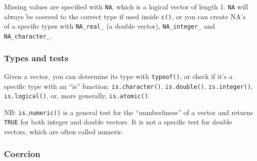 Missing values are specified with \texttt{NA}, which is a logical vector
of length 1. \texttt{NA} will always be coerced to the correct type if
used inside \texttt{c()}, or you can create NA's of a specific types
with \texttt{NA\_real\_} (a double vector), \texttt{NA\_integer\_} and
\texttt{NA\_character\_}.

\subsubsection{Types and tests}\label{types-and-tests}

Given a vector, you can determine its type with \texttt{typeof()}, or
check if it's a specific type with an ``is'' function:
\texttt{is.character()}, \texttt{is.double()}, \texttt{is.integer()},
\texttt{is.logical()}, or, more generally, \texttt{is.atomic()}.

\begin{Shaded}
\begin{Highlighting}[]
\StringTok{ }

\StringTok{ }\NormalTok{(}\NormalTok{, }\NormalTok{, }\NormalTok{)}
\end{Highlighting}
\end{Shaded}

NB: \texttt{is.numeric()} is a general test for the ``numberliness'' of
a vector and returns \texttt{TRUE} for both integer and double vectors.
It is not a specific test for double vectors, which are often called
numeric.

\begin{Shaded}
\begin{Highlighting}[]
\end{Highlighting}
\end{Shaded}

\subsubsection{Coercion}\label{coercion}

